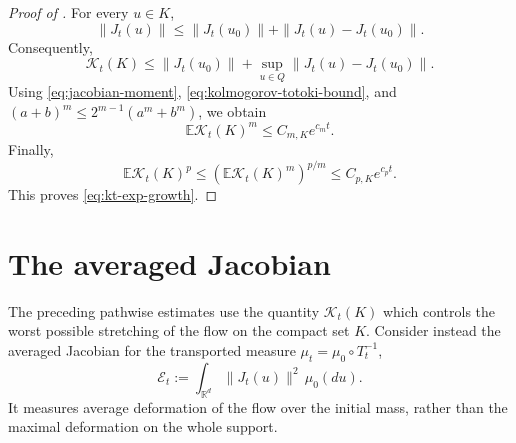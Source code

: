 \documentclass{tsp-short}
\theoremstyle{remark}
\theoremstyle{definition}
\newcommand{\R}{\mathbb{R}} %
\newcommand{\E}{\mathbb E} %
\begin{document}
\begin{proof}[Proof of ]

	For every \(u\in K\),
	\begin{equation*}
		\|J_t(u)\| \le \|J_t(u_0)\| + \|J_t(u)-J_t(u_0)\|.
	\end{equation*}
	Consequently,
	\begin{equation*}
		\mathcal K_t(K) \le \|J_t(u_0)\| + \sup_{u\in Q} \|J_t(u)-J_t(u_0)\|.
	\end{equation*}
	Using \eqref{eq:jacobian-moment}, \eqref{eq:kolmogorov-totoki-bound}, and \((a+b)^m\le 2^{m-1}(a^m+b^m)\), we obtain
	\begin{equation*}
		\E\mathcal K_t(K)^m \le C_{m,K}e^{c_mt}.
	\end{equation*}
	Finally,
	\begin{equation*}
		\E\mathcal K_t(K)^p\le \left( \E\mathcal K_t(K)^m \right)^{p/m} \le C_{p,K}e^{c_pt}.
	\end{equation*}
	This proves \eqref{eq:kt-exp-growth}.
\end{proof}

\clearpage

\section{The averaged Jacobian}\label{sec:averaged-jacobian}

The preceding pathwise estimates use the quantity \(\mathcal K_t(K)\) which controls the worst possible stretching of the flow on the
compact set \(K\). Consider instead the averaged Jacobian for the transported measure \(\mu_t=\mu_0\circ T_t^{-1}\),
\begin{equation*}
	\mathcal E_t := \int_{\R^d}\|J_t(u)\|^2\,\mu_0(du).
\end{equation*}
It measures average deformation of the flow over the initial mass, rather than
the maximal deformation on the whole support.
\end{document}
